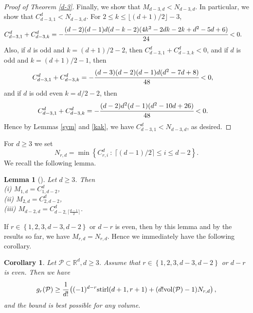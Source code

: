 \documentclass[12pt]{amsart}
\newtheorem{lemma}[theorem]{Lemma}
\newtheorem{corollary}[theorem]{Corollary}
\theoremstyle{definition}
\theoremstyle{remark}
\numberwithin{equation}{section}
\def\Pc{{\mathcal P}}
\def\NZQ{\mathbb}               %
\def\RR{{\NZQ R}}
\begin{document}
\begin{proof}[Proof of Theorem \ref{d-3}]
Finally, we show that $M_{d-3,d}<N_{d-3,d}$.
In particular, we show that $C_{d-3,1}^d<N_{d-3,d}$.
For $2 \leq k \leq \lfloor (d+1)/2 \rfloor-3$,
\begin{displaymath}
\begin{aligned}
C_{d-3,1}^d+C_{d-3,k}^d&=-\cfrac{(d-2)(d-1)d(d-k-2)(4k^2-2dk-2k+d^2-5d+6)}{24}<0.
\end{aligned}
\end{displaymath}
Also, if $d$ is odd and $k=(d+1)/2-2$, then $C_{d-3,1}^d+C_{d-3,k}^d<0$,
and if $d$ is odd and $k=(d+1)/2-1$, then 
 \begin{displaymath}
 \begin{aligned}
 C_{d-3,1}^d+C_{d-3,k}^d&=-\cfrac{(d-3)(d-2)(d-1)d(d^2-7d+8)}{48}<0,
 \end{aligned}
 \end{displaymath}
and if $d$ is odd even $k=d/2-2$, then
 \begin{displaymath}
 \begin{aligned}
 C_{d-3,1}^d+C_{d-3,k}^d&=-\cfrac{(d-2)d^2(d-1)(d^2-10d+26)}{48}<0.
 \end{aligned}
 \end{displaymath}
Hence by Lemmas \ref{sym} and \ref{kak}, we have $C_{d-3,1}^d<N_{d-3,d}$, as desired.
\end{proof}

For $d\geq 3$ we set  
$$N_{r,d}=\min\left\{C^d_{r,i}\ : \ \lceil (d-1)/2 \rceil \leq i \leq d-2 \right\}.$$ 
We recall the following lemma.

\begin{lemma}[{\cite[Proposition 2.1]{lower}}]
	Let $d \geq 3$.
	Then\\
	\textnormal{(i)} $M_{1,d}=C_{1,d-2}^d$,\\
	\textnormal{(ii)} $M_{2,d}=C_{2,d-2}^d$,\\
	\textnormal{(iii)} $M_{d-2,d}=C_{d-2,\lceil\frac{d-1}{2}\rceil}^d$.
\end{lemma}

If $r \in \left\{1,2,3,d-3,d-2\right\}$ or $d-r$ is even, then by this lemma and by the results so far, we have $M_{r,d}=N_{r,d}$.
Hence we immediately have the following corollary.
\begin{corollary}
	Let $\Pc \subset \RR^d, d \geq 3$. 
	Assume that $r \in \left\{1,2,3,d-3,d-2\right\}$ or $d-r$ is even.
	Then we have
	$$g_{r}(\Pc) \geq \cfrac{1}{d!}\left((-1)^{d-r}\textnormal{stirl}(d+1,r+1)+(d!\textnormal{vol}(\Pc)-1)N_{r,d}\right),$$
	and the bound is best possible for any volume.
\end{corollary}
\end{document}

